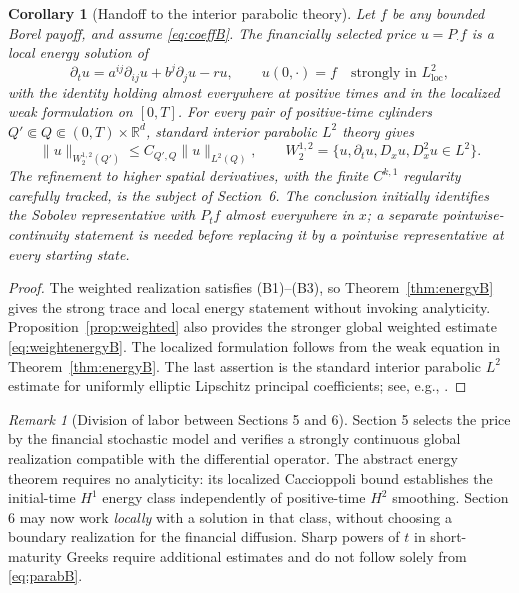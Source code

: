 \documentclass[11pt,a4paper]{article}
\newtheorem{corollary}[theorem]{Corollary}
\theoremstyle{definition}\newtheorem{definition}{Definition}[section]\newtheorem{example}[theorem]{Example}
\theoremstyle{remark}\newtheorem{remark}[theorem]{Remark}\newtheorem{remarkSix}{Remark}[section]
\newcommand{\Rd}{\mathbb R^d}
\newcommand{\loc}{\mathrm{loc}}
\newcommand{\norm}[1]{\lVert #1\rVert}
\begin{document}
\begin{corollary}[Handoff to the interior parabolic theory]\label{cor:handoffB}
Let $f$ be any bounded Borel payoff, and assume \eqref{eq:coeffB}. The financially selected price $u=P_\cdot f$ is a local energy solution of
\begin{equation}\label{eq:KolB}
 \partial_tu=a^{ij}\partial_{ij}u+b^j\partial_ju-ru,
 \qquad u(0,\cdot)=f\quad\text{strongly in }L^2_{\loc},
\end{equation}
with the identity holding almost everywhere at positive times and in the localized weak formulation on $[0,T]$. For every pair of positive-time cylinders $Q'\Subset Q\Subset(0,T)\times\Rd$, standard interior parabolic $L^2$ theory gives
\begin{equation}\label{eq:parabB}
 \norm u_{W^{1,2}_2(Q')}\le C_{Q',Q}\norm u_{L^2(Q)},\qquad
 W^{1,2}_2=\{u,\partial_tu,D_xu,D_x^2u\in L^2\}.
\end{equation}
The refinement to higher spatial derivatives, with the finite $C^{k,1}$ regularity carefully tracked, is the subject of Section~6. The conclusion initially identifies the Sobolev representative with $P_tf$ almost everywhere in $x$; a separate pointwise-continuity statement is needed before replacing it by a pointwise representative at every starting state.
\end{corollary}
\begin{proof}
The weighted realization satisfies (B1)--(B3), so Theorem~\ref{thm:energyB} gives the strong trace and local energy statement without invoking analyticity. Proposition~\ref{prop:weighted} also provides the stronger global weighted estimate \eqref{eq:weightenergyB}. The localized formulation follows from the weak equation in Theorem~\ref{thm:energyB}. The last assertion is the standard interior parabolic $L^2$ estimate for uniformly elliptic Lipschitz principal coefficients; see, e.g., \cite[Ch.~2]{krylov}.
\end{proof}

\begin{remark}[Division of labor between Sections 5 and 6]
Section 5 selects the price by the financial stochastic model and verifies a strongly continuous global realization compatible with the differential operator. The abstract energy theorem requires no analyticity: its localized Caccioppoli bound establishes the initial-time $H^1$ energy class independently of positive-time $H^2$ smoothing. Section 6 may now work \emph{locally} with a solution in that class, without choosing a boundary realization for the financial diffusion. Sharp powers of $t$ in short-maturity Greeks require additional estimates and do not follow solely from \eqref{eq:parabB}.
\end{remark}
\end{document}
